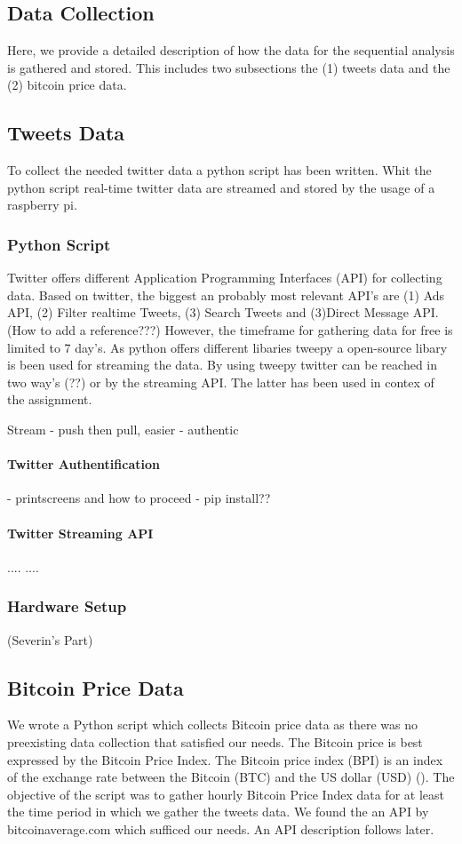 \documentclass[a4paper,12pt]{article}
\begin{document}
\begin{spacing}{1.2}
\section{Data Collection}
Here, we provide a detailed description of how the data for the sequential analysis is gathered and stored. This includes two  subsections the (1) tweets data and the (2) bitcoin price data.
\subsection{Tweets Data}
To collect the needed twitter data a python script has been written. Whit the python script real-time twitter data are streamed and stored by the usage of a raspberry pi.
\subsubsection{Python Script}
Twitter offers different Application Programming Interfaces (API) for collecting data. Based on twitter, the biggest an probably most relevant API's are (1) Ads API, (2) Filter realtime Tweets, (3) Search Tweets and (3)Direct Message API. (How to add a reference???) However, the timeframe for gathering data for free is limited to 7 day's. As python offers different libaries tweepy a open-source libary is been used for streaming the data. By using tweepy twitter can be reached in two way's (??) or by the streaming API. The latter has been used in contex of the assignment.

Stream - push then pull, easier
- authentic
\paragraph{Twitter Authentification}
- printscreens and how to proceed
- pip install??

\paragraph{Twitter Streaming API}
....
....

\subsubsection{Hardware Setup}
(Severin's Part)

\subsection{Bitcoin Price Data}
We wrote a Python script which collects Bitcoin price data as there was no preexisting data collection that satisfied our needs. The Bitcoin price is best expressed by the Bitcoin Price Index. The Bitcoin price index (BPI) is an index of the exchange rate between the Bitcoin (BTC) and the US dollar (USD) (\cite{kristoufek2015main}). The objective of the script was to gather hourly Bitcoin Price Index data for at least the time period in which we gather the tweets data. We found the an API by bitcoinaverage.com which sufficed our needs. An API description follows later.

\end{spacing}
\end{document}
